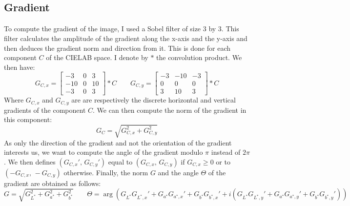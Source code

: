 \documentclass[11pt]{article}
\begin{document}
	\subsection{Gradient}
	
	\paragraph{}
	To compute the gradient of the image, I used a Sobel filter of size $3$ by $3$. This filter calculates the amplitude of the gradient along the x-axis and the y-axis and then deduces the gradient norm and direction from it. This is done for each component $C$ of the CIELAB space. I denote by $\ast$ the convolution product. We then have:
	$$ G_{C, x} = \begin{bmatrix} -3 & 0 & 3 \\ -10 & 0 & 10 \\ -3 & 0 & 3 \end{bmatrix} \ast C
		\qquad G_{C, y} = \begin{bmatrix} -3 & -10 & -3 \\ 0 & 0 & 0 \\ 3 & 10 & 3 \end{bmatrix} \ast C
	$$
	Where $G_{C, x}$ and $G_{C, y}$ are are respectively the discrete horizontal and vertical gradients of the component $C$. We can then compute the norm of the gradient in this component:
	$$ G_C = \sqrt{G_{C, x}^2 + G_{C, y}^2} $$
	As only the direction of the gradient and not the orientation of the gradient interests us, we want to compute the angle of the gradient modulo $\pi$ instead of $2 \pi$. We then defines $(G_{C, x}', \, G_{C, y}')$ equal to $(G_{C, x}, \, G_{C, y})$ if $G_{C, x} \geqslant 0$ or to $(-G_{C, x}, \, -G_{C, y})$ otherwise. Finally, the norm $G$ and the angle $\Theta$ of the gradient are obtained as follows:
	$$ G = \sqrt{G_{L^*}^2 + G_{a^*}^2 + G_{b^*}^2} \qquad \Theta = \arg \left( G_{L^*} G_{L^*, x}' + G_{a^*} G_{a^*, x}' + G_{b^*} G_{b^*, x}' + i \left( G_{L^*} G_{L^*, y}' + G_{a^*} G_{a^*, y}' + G_{b^*} G_{b^*, y}' \right) \right) $$
	
\end{document}
